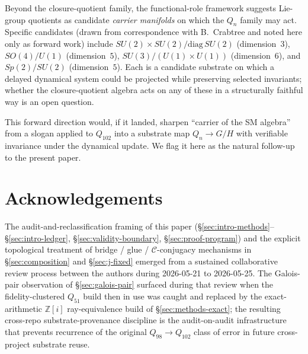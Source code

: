 \documentclass[12pt,a4paper]{article}
\theoremstyle{definition}
\theoremstyle{remark}
\newcommand{\bZ}{\mathbb{Z}}
\newcommand{\Qn}{Q_n}
\newcommand{\Ccls}{\mathcal{C}}             %
\begin{document}
Beyond the closure-quotient family, the functional-role framework
suggests Lie-group quotients as candidate \emph{carrier manifolds} on
which the $\Qn$ family may act. Specific candidates (drawn from
correspondence with B.\ Crabtree and noted here only as forward work)
include $SU(2) \times SU(2) / \mathrm{diag}\, SU(2)$ (dimension~$3$),
$SO(4)/U(1)$ (dimension~$5$), $SU(3)/(U(1) \times U(1))$
(dimension~$6$), and $Sp(2)/SU(2)$ (dimension~$5$). Each is a
candidate substrate on which a delayed dynamical system could be
projected while preserving selected invariants; whether the
closure-quotient algebra acts on any of these in a structurally
faithful way is an open question.

This forward direction would, if it landed, sharpen ``carrier of the
SM algebra'' from a slogan applied to $Q_{102}$ into a substrate map
$Q_{n} \to G/H$ with verifiable invariance under the dynamical update.
We flag it here as the natural follow-up to the present paper.


\section*{Acknowledgements}

The audit-and-reclassification framing of this paper
(\S\ref{sec:intro-methods}--\S\ref{sec:intro-ledger},
\S\ref{sec:validity-boundary}, \S\ref{sec:proof-program}) and the
explicit topological treatment of bridge / glue / $\Ccls$-conjugacy
mechanisms in \S\ref{sec:composition} and \S\ref{sec:j-fixed}
emerged from a sustained collaborative review process between the
authors during 2026-05-21 to 2026-05-25. The Galois-pair observation
of \S\ref{sec:galois-pair} surfaced during that review when the
fidelity-clustered $Q_{51}$ build then in use was caught and replaced
by the exact-arithmetic $\bZ[i]$ ray-equivalence build of
\S\ref{sec:methods-exact}; the resulting cross-repo
substrate-provenance discipline
\cite{tce-substrate-provenance} is the audit-on-audit infrastructure
that prevents recurrence of the original $Q_{98} \to Q_{102}$ class of
error in future cross-project substrate reuse.

\end{document}
